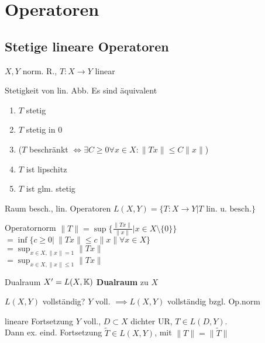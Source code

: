 \section{Operatoren}


\subsection{Stetige lineare Operatoren}
$X,Y$ norm. R., $T:X\to Y$ linear\\
\begin{satz}{Stetigkeit von lin. Abb.}
  Es sind äquivalent
  \begin{enumerate}[label = (\roman*)]
    \item $T$ stetig
    \item $T$ stetig in $0$
    \item ($T$ beschränkt $\Leftrightarrow \exists C \geq 0 \forall x \in X:
      \|Tx\| \leq C\|x\|$)
    \item $T$ ist lipschitz
    \item $T$ ist glm. stetig
  \end{enumerate}
\end{satz}

\begin{definition}{Raum besch., lin. Operatoren}
  $L(X,Y)=\{ T:X \to Y|T \text{ lin. u. besch.} \}$
\end{definition}

\begin{definition}{Operatornorm}
  \(
    \|T\| = \sup \{ \frac{\|Tx\|}{\|x\|}| x\in X \setminus \{0\}\}
  \)\\
  \(
    = \inf \{ c \geq 0|\ \|Tx\| \leq c \|x\| \forall x\in X \}
  \)\\
  \(
    = \sup_{x\in X, \|x\| = 1}\|Tx\|
  \)\\
  \(
    = \sup_{x\in X, \|x\| \leq 1}\|Tx\|
  \)
\end{definition}

\begin{definition}{Dualraum}
  $X' = L(X,\mathbb{K})$ \textbf{Dualraum} zu $X$
\end{definition}

\begin{satz}{$L(X,Y)$ vollständig?}
  $Y$ voll. $\implies L(X,Y)$ vollständig bzgl. Op.norm
\end{satz}

\begin{satz}{lineare Fortsetzung}
  $Y$ voll., $D \subset X$ dichter UR, $T \in L(D,Y)$.\\
  Dann ex. eind. Fortsetzung $\tilde{T} \in L(X,Y)$, mit $\|T\|=\|\tilde{T}\|$
\end{satz}

